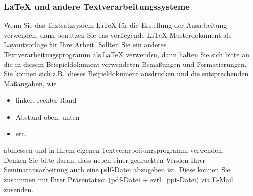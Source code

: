 \subsubsection{{\LaTeX} und andere Textverarbeitungssysteme}
Wenn Sie das Textsatzsystem {\LaTeX}\index{\LaTeX} für die Erstellung der Ausarbeitung verwenden, dann benutzen Sie das vorliegende \LaTeX-Musterdokument als Layoutvorlage für Ihre Arbeit.
Sollten Sie ein anderes Textverarbeitungsprogramm als {\LaTeX} verwenden, dann halten Sie sich bitte an die in diesem Beispieldokument verwendeten Bemaßungen und Formatierungen.
Sie können sich z.B.~dieses Beipieldokument ausdrucken und die entsprechenden Maßangaben, wie
\begin{itemize}
\item linker, rechter Rand
\item Abstand oben, unten
\item etc.
\end{itemize}
abmessen und in Ihrem eigenen Textverarbeitungsprogramm verwenden. \\
Denken Sie bitte daran, dass neben einer gedruckten Version Ihrer Seminarausarbeitung auch eine {\bf pdf}-Datei abzugeben ist.
Diese können Sie zusammen mit Ihrer Präsentation (pdf-Datei + evtl.~ppt-Datei) via E-Mail zusenden.
